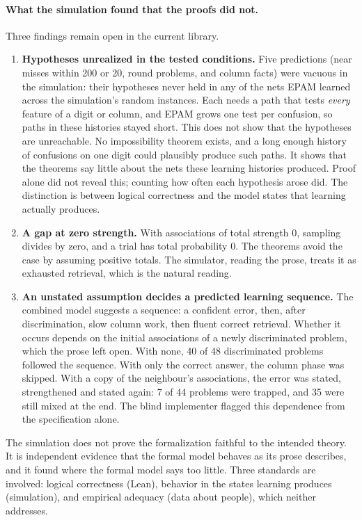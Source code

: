 \documentclass[11pt]{article}
\begin{document}
\paragraph{What the simulation found that the proofs did not.} Three findings remain open in the current library.
\begin{enumerate}
  \item \textbf{Hypotheses unrealized in the tested conditions.} Five predictions (near misses within 200 or 20, round problems, and column facts) were vacuous in the simulation: their hypotheses never held in any of the nets EPAM learned across the simulation's random instances. Each needs a path that tests \emph{every} feature of a digit or column, and EPAM grows one test per confusion, so paths in these histories stayed short. This does not show that the hypotheses are unreachable. No impossibility theorem exists, and a long enough history of confusions on one digit could plausibly produce such paths. It shows that the theorems say little about the nets these learning histories produced. Proof alone did not reveal this; counting how often each hypothesis arose did. The distinction is between logical correctness and the model states that learning actually produces.
  \item \textbf{A gap at zero strength.} With associations of total strength 0, sampling divides by zero, and a trial has total probability 0. The theorems avoid the case by assuming positive totals. The simulator, reading the prose, treats it as exhausted retrieval, which is the natural reading.
  \item \textbf{An unstated assumption decides a predicted learning sequence.} The combined model suggests a sequence: a confident error, then, after discrimination, slow column work, then fluent correct retrieval. Whether it occurs depends on the initial associations of a newly discriminated problem, which the prose left open. With none, 40 of 48 discriminated problems followed the sequence. With only the correct answer, the column phase was skipped. With a copy of the neighbour's associations, the error was stated, strengthened and stated again: 7 of 44 problems were trapped, and 35 were still mixed at the end. The blind implementer flagged this dependence from the specification alone.
\end{enumerate}

The simulation does not prove the formalization faithful to the intended theory. It is independent evidence that the formal model behaves as its prose describes, and it found where the formal model says too little. Three standards are involved: logical correctness (Lean), behavior in the states learning produces (simulation), and empirical adequacy (data about people), which neither addresses.
\end{document}

